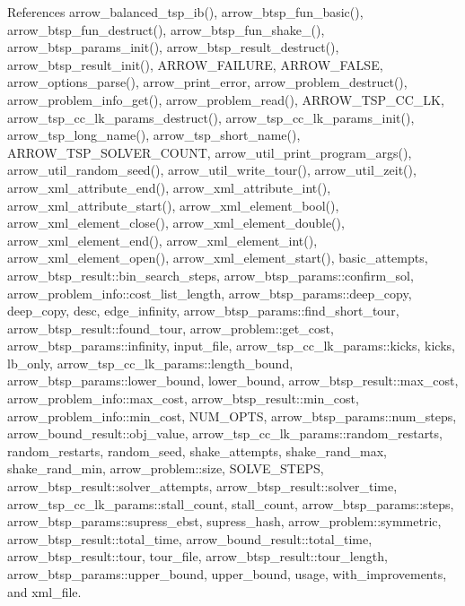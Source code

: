 References arrow\_\-balanced\_\-tsp\_\-ib(), arrow\_\-btsp\_\-fun\_\-basic(), arrow\_\-btsp\_\-fun\_\-destruct(), arrow\_\-btsp\_\-fun\_\-shake\_(), arrow\_\-btsp\_\-params\_\-init(), arrow\_\-btsp\_\-result\_\-destruct(), arrow\_\-btsp\_\-result\_\-init(), ARROW\_\-FAILURE, ARROW\_\-FALSE, arrow\_\-options\_\-parse(), arrow\_\-print\_\-error, arrow\_\-problem\_\-destruct(), arrow\_\-problem\_\-info\_\-get(), arrow\_\-problem\_\-read(), ARROW\_\-TSP\_\-CC\_\-LK, arrow\_\-tsp\_\-cc\_\-lk\_\-params\_\-destruct(), arrow\_\-tsp\_\-cc\_\-lk\_\-params\_\-init(), arrow\_\-tsp\_\-long\_\-name(), arrow\_\-tsp\_\-short\_\-name(), ARROW\_\-TSP\_\-SOLVER\_\-COUNT, arrow\_\-util\_\-print\_\-program\_\-args(), arrow\_\-util\_\-random\_\-seed(), arrow\_\-util\_\-write\_\-tour(), arrow\_\-util\_\-zeit(), arrow\_\-xml\_\-attribute\_\-end(), arrow\_\-xml\_\-attribute\_\-int(), arrow\_\-xml\_\-attribute\_\-start(), arrow\_\-xml\_\-element\_\-bool(), arrow\_\-xml\_\-element\_\-close(), arrow\_\-xml\_\-element\_\-double(), arrow\_\-xml\_\-element\_\-end(), arrow\_\-xml\_\-element\_\-int(), arrow\_\-xml\_\-element\_\-open(), arrow\_\-xml\_\-element\_\-start(), basic\_\-attempts, arrow\_\-btsp\_\-result::bin\_\-search\_\-steps, arrow\_\-btsp\_\-params::confirm\_\-sol, arrow\_\-problem\_\-info::cost\_\-list\_\-length, arrow\_\-btsp\_\-params::deep\_\-copy, deep\_\-copy, desc, edge\_\-infinity, arrow\_\-btsp\_\-params::find\_\-short\_\-tour, arrow\_\-btsp\_\-result::found\_\-tour, arrow\_\-problem::get\_\-cost, arrow\_\-btsp\_\-params::infinity, input\_\-file, arrow\_\-tsp\_\-cc\_\-lk\_\-params::kicks, kicks, lb\_\-only, arrow\_\-tsp\_\-cc\_\-lk\_\-params::length\_\-bound, arrow\_\-btsp\_\-params::lower\_\-bound, lower\_\-bound, arrow\_\-btsp\_\-result::max\_\-cost, arrow\_\-problem\_\-info::max\_\-cost, arrow\_\-btsp\_\-result::min\_\-cost, arrow\_\-problem\_\-info::min\_\-cost, NUM\_\-OPTS, arrow\_\-btsp\_\-params::num\_\-steps, arrow\_\-bound\_\-result::obj\_\-value, arrow\_\-tsp\_\-cc\_\-lk\_\-params::random\_\-restarts, random\_\-restarts, random\_\-seed, shake\_\-attempts, shake\_\-rand\_\-max, shake\_\-rand\_\-min, arrow\_\-problem::size, SOLVE\_\-STEPS, arrow\_\-btsp\_\-result::solver\_\-attempts, arrow\_\-btsp\_\-result::solver\_\-time, arrow\_\-tsp\_\-cc\_\-lk\_\-params::stall\_\-count, stall\_\-count, arrow\_\-btsp\_\-params::steps, arrow\_\-btsp\_\-params::supress\_\-ebst, supress\_\-hash, arrow\_\-problem::symmetric, arrow\_\-btsp\_\-result::total\_\-time, arrow\_\-bound\_\-result::total\_\-time, arrow\_\-btsp\_\-result::tour, tour\_\-file, arrow\_\-btsp\_\-result::tour\_\-length, arrow\_\-btsp\_\-params::upper\_\-bound, upper\_\-bound, usage, with\_\-improvements, and xml\_\-file.

